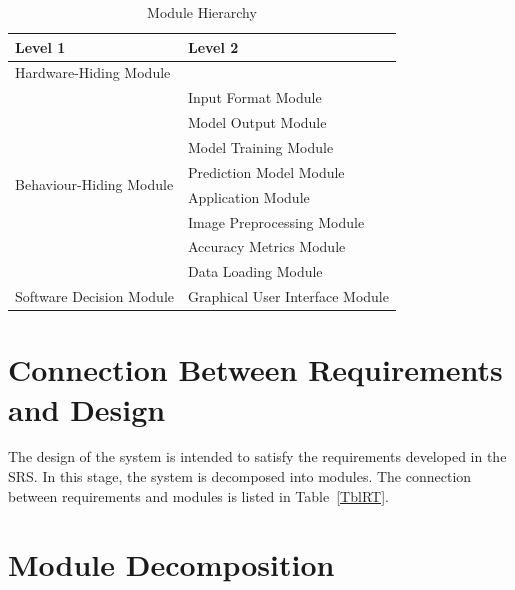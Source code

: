 \documentclass[12pt, titlepage]{article}
\begin{document}
\begin{table}[h!]
\centering
\begin{tabular}{p{} p{}}
\toprule
\textbf{Level 1} & \textbf{Level 2}\\
\midrule

{Hardware-Hiding Module} & ~ \\
\midrule

\multirow{8}{0.3\textwidth}{Behaviour-Hiding Module} &
Input Format Module\\
& Model Output Module\\
& Model Training Module\\
& Prediction Model Module\\
& Application Module\\
& Image Preprocessing Module\\
& Accuracy Metrics Module\\
& Data Loading Module\\
\midrule

\multirow{1}{0.3\textwidth}{Software Decision Module}&
Graphical User Interface Module\\
\bottomrule

\end{tabular}
\caption{Module Hierarchy}
\label{TblMH}
\end{table}

\section{Connection Between Requirements and Design} \label{SecConnection}

The design of the system is intended to satisfy the requirements developed in
the SRS. In this stage, the system is decomposed into modules. The connection
between requirements and modules is listed in Table~\ref{TblRT}.


\section{Module Decomposition} \label{SecMD}
\end{document}
